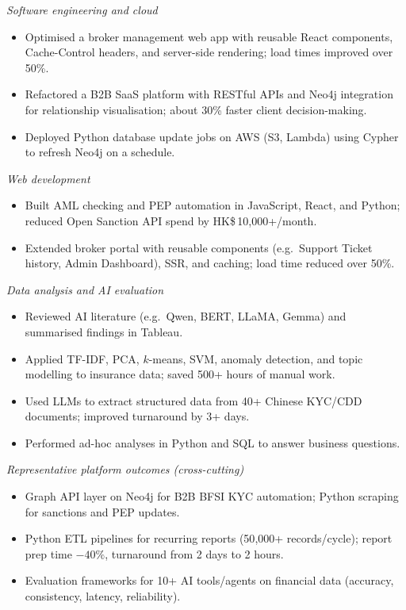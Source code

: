 \documentclass[10pt,a4paper]{article}
\begin{document}
\noindent\textit{Software engineering and cloud}
\begin{itemize}
  \item Optimised a broker management web app with reusable React components, Cache-Control headers, and server-side rendering; load times improved over 50\%.
  \item Refactored a B2B SaaS platform with RESTful APIs and Neo4j integration for relationship visualisation; about 30\% faster client decision-making.
  \item Deployed Python database update jobs on AWS (S3, Lambda) using Cypher to refresh Neo4j on a schedule.
\end{itemize}

\noindent\textit{Web development}
\begin{itemize}
  \item Built AML checking and PEP automation in JavaScript, React, and Python; reduced Open Sanction API spend by HK\$\,10{,}000+/month.
  \item Extended broker portal with reusable components (e.g.\ Support Ticket history, Admin Dashboard), SSR, and caching; load time reduced over 50\%.
\end{itemize}

\noindent\textit{Data analysis and AI evaluation}
\begin{itemize}
  \item Reviewed AI literature (e.g.\ Qwen, BERT, LLaMA, Gemma) and summarised findings in Tableau.
  \item Applied TF-IDF, PCA, $k$-means, SVM, anomaly detection, and topic modelling to insurance data; saved 500+ hours of manual work.
  \item Used LLMs to extract structured data from 40+ Chinese KYC/CDD documents; improved turnaround by 3+ days.
  \item Performed ad-hoc analyses in Python and SQL to answer business questions.
\end{itemize}

\noindent\textit{Representative platform outcomes (cross-cutting)}
\begin{itemize}
  \item Graph API layer on Neo4j for B2B BFSI KYC automation; Python scraping for sanctions and PEP updates.
  \item Python ETL pipelines for recurring reports (50{,}000+ records/cycle); report prep time $-40\%$, turnaround from 2 days to 2 hours.
  \item Evaluation frameworks for 10+ AI tools/agents on financial data (accuracy, consistency, latency, reliability).
\end{itemize}
\end{document}
